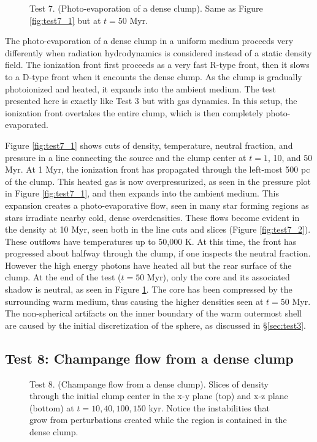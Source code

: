 \documentclass[12pt,preprint]{aastex}
\begin{document}
\begin{figure}[t]
  \caption{\label{fig:test7_3} Test 7. (Photo-evaporation of a dense
    clump).  Same as Figure \ref{fig:test7_1} but at $t = 50$ Myr.}
\end{figure}

The photo-evaporation of a dense clump in a uniform medium proceeds
very differently when radiation hydrodynamics is considered instead of
a static density field.  The ionization front first proceeds as a very
fast R-type front, then it slows to a D-type front when it encounts
the dense clump.  As the clump is gradually photoionized and heated,
it expands into the ambient medium.  The test presented here is
exactly like Test 3 but with gas dynamics.  In this setup, the
ionization front overtakes the entire clump, which is then completely
photo-evaporated.

Figure \ref{fig:test7_1} shows cuts of density, temperature, neutral
fraction, and pressure in a line connecting the source and the clump
center at $t = 1$, 10, and 50 Myr.  At 1 Myr, the ionization front has
propagated through the left-most 500 pc of the clump.  This heated gas
is now overpressurized, as seen in the pressure plot in Figure
\ref{fig:test7_1}, and then expands into the ambient medium.  This
expansion creates a photo-evaporative flow, seen in many star forming
regions \citep[e.g. the Carina Nebula][]{Ref?} as stars irradiate
nearby cold, dense overdensities.  These flows become evident in the
density at 10 Myr, seen both in the line cuts and slices (Figure
\ref{fig:test7_2}).  These outflows have temperatures up to 50,000 K.
At this time, the front has progressed about halfway through the
clump, if one inspects the neutral fraction.  However the high energy
photons have heated all but the rear surface of the clump.  At the end
of the test ($t = 50$ Myr), only the core and its associated shadow is
neutral, as seen in Figure \ref{fig:test7_3}.  The core has been
compressed by the surrounding warm medium, thus causing the higher
densities seen at $t = 50$ Myr.  The non-spherical artifacts on the
inner boundary of the warm outermost shell are caused by the initial
discretization of the sphere, as discussed in \S\ref{sec:test3}.

\subsection{Test 8: Champange flow from a dense clump}

\begin{figure}[t]
  \caption{\label{fig:test8_1} Test 8. (Champange flow from a dense
    clump).  Slices of density through the initial clump center in the
    x-y plane (top) and x-z plane (bottom) at $t = 10, 40, 100, 150$
    kyr.  Notice the instabilities that grow from perturbations
    created while the  region is contained in the dense
    clump.}
\end{figure}
\end{document}

